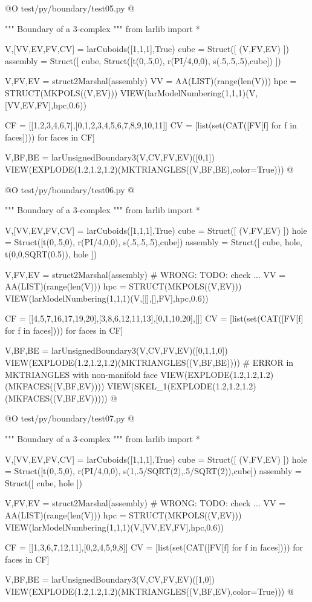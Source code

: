 \documentclass[11pt,oneside]{article}	%
\begin{document}
@O test/py/boundary/test05.py
@{""" Boundary of a 3-complex """
from larlib import *

V,[VV,EV,FV,CV] = larCuboids([1,1,1],True)
cube = Struct([ (V,FV,EV) ])
assembly = Struct([ cube, Struct([t(0,.5,0), r(PI/4,0,0), s(.5,.5,.5),cube]) ])

V,FV,EV = struct2Marshal(assembly)
VV = AA(LIST)(range(len(V)))
hpc = STRUCT(MKPOLS((V,EV)))
VIEW(larModelNumbering(1,1,1)(V,[VV,EV,FV],hpc,0.6))

CF = [[1,2,3,4,6,7],[0,1,2,3,4,5,6,7,8,9,10,11]]
CV = [list(set(CAT([FV[f]  for f in faces]))) for faces in CF]

V,BF,BE = larUnsignedBoundary3(V,CV,FV,EV)([0,1])
VIEW(EXPLODE(1.2,1.2,1.2)(MKTRIANGLES((V,BF,BE),color=True))) 
@}

@O test/py/boundary/test06.py
@{""" Boundary of a 3-complex """
from larlib import *

V,[VV,EV,FV,CV] = larCuboids([1,1,1],True)
cube = Struct([ (V,FV,EV) ])
hole = Struct([t(0,.5,0), r(PI/4,0,0), s(.5,.5,.5),cube])
assembly = Struct([ cube, hole, t(0,0,SQRT(0.5)), hole ])

V,FV,EV = struct2Marshal(assembly) # WRONG:  TODO: check ...
VV = AA(LIST)(range(len(V)))
hpc = STRUCT(MKPOLS((V,EV)))
VIEW(larModelNumbering(1,1,1)(V,[[],[],FV],hpc,0.6))

CF = [[4,5,7,16,17,19,20],[3,8,6,12,11,13],[0,1,10,20],[]]
CV = [list(set(CAT([FV[f]  for f in faces]))) for faces in CF]

V,BF,BE = larUnsignedBoundary3(V,CV,FV,EV)([0,1,1,0])
VIEW(EXPLODE(1.2,1.2,1.2)(MKTRIANGLES((V,BF,BE)))) # ERROR in MKTRIANGLES with non-manifold face
VIEW(EXPLODE(1.2,1.2,1.2)(MKFACES((V,BF,EV))))
VIEW(SKEL_1(EXPLODE(1.2,1.2,1.2)(MKFACES((V,BF,EV)))))
@}

@O test/py/boundary/test07.py
@{""" Boundary of a 3-complex """
from larlib import *

V,[VV,EV,FV,CV] = larCuboids([1,1,1],True)
cube = Struct([ (V,FV,EV) ])
hole = Struct([t(0,.5,0), r(PI/4,0,0), s(1,.5/SQRT(2),.5/SQRT(2)),cube])
assembly = Struct([ cube, hole ])

V,FV,EV = struct2Marshal(assembly) # WRONG:  TODO: check ...
VV = AA(LIST)(range(len(V)))
hpc = STRUCT(MKPOLS((V,EV)))
VIEW(larModelNumbering(1,1,1)(V,[VV,EV,FV],hpc,0.6))

CF = [[1,3,6,7,12,11],[0,2,4,5,9,8]]
CV = [list(set(CAT([FV[f]  for f in faces]))) for faces in CF]

V,BF,BE = larUnsignedBoundary3(V,CV,FV,EV)([1,0])
VIEW(EXPLODE(1.2,1.2,1.2)(MKTRIANGLES((V,BF,EV),color=True)))
@}
\end{document}
